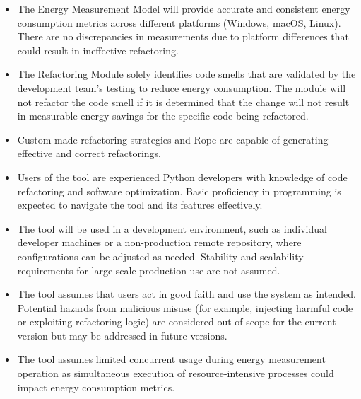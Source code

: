 \documentclass{article}
\newcounter{hazard}
\begin{document}
\begin{itemize}
    \item The Energy Measurement Model will provide accurate and consistent energy consumption metrics across different platforms (Windows, macOS, Linux). There are no discrepancies in measurements due to platform differences that could result in ineffective refactoring.
    \item The Refactoring Module solely identifies code smells that are validated by the development team's testing to reduce energy consumption. The module will not refactor the code smell if it is determined that the change will not result in measurable energy savings for the specific code being refactored.
    \item Custom-made refactoring strategies and Rope are capable of generating effective and correct refactorings.
    \item Users of the tool are experienced Python developers with knowledge of code refactoring and software optimization. Basic proficiency in programming is expected to navigate the tool and its features effectively.
    \item The tool will be used in a development environment, such as individual developer machines or a non-production remote repository, where configurations can be adjusted as needed. Stability and scalability requirements for large-scale production use are not assumed.
    \item The tool assumes that users act in good faith and use the system as intended. Potential hazards from malicious misuse (for example, injecting harmful code or exploiting refactoring logic) are considered out of scope for the current version but may be addressed in future versions.
    \item The tool assumes limited concurrent usage during energy measurement operation as simultaneous execution of resource-intensive processes could impact energy consumption metrics.
\end{itemize}

\end{document}
